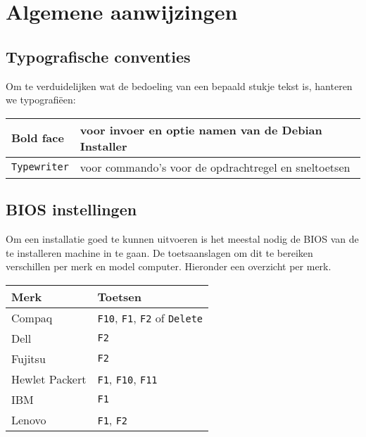 \section{Algemene aanwijzingen}
\subsection{Typografische conventies}
Om te verduidelijken wat de bedoeling van een bepaald stukje tekst is, hanteren we typografi\"{e}en:
\begin{table}[H]
\begin{tabular}{| l | l |}
	\hline
	\textbf{Bold face} & voor invoer en optie namen van de Debian Installer\\
	\hline
	\texttt{Typewriter} & voor commando's voor de opdrachtregel en sneltoetsen\\
	\hline
\end{tabular}
\end{table}

\subsection{BIOS instellingen}
Om een installatie goed te kunnen uitvoeren is het meestal nodig de BIOS van de te installeren machine in te gaan. De toetsaanslagen om dit te bereiken verschillen per merk en model computer. Hieronder een overzicht per merk.
\begin{table}[H]
	\begin{tabular}{| l | l |}
	\hline 
	\textbf{Merk} & \textbf{Toetsen} \\
	\hline
	Compaq & \texttt{F10}, \texttt{F1}, \texttt{F2} of \texttt{Delete}\\
	\hline
	Dell & \texttt{F2} \\
	\hline
	Fujitsu & \texttt{F2} \\
	\hline
	Hewlet Packert &  \texttt{F1}, \texttt{F10}, \texttt{F11} \\
	\hline
	IBM &  \texttt{F1} \\
	\hline
	Lenovo &  \texttt{F1}, \texttt{F2} \\
	\hline
\end{tabular}
\end{table}
